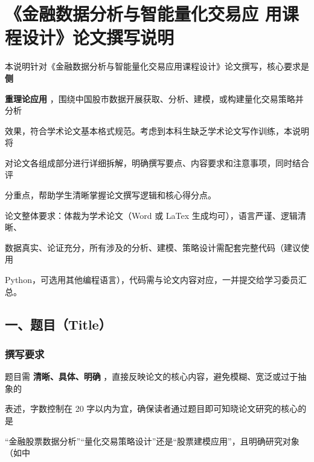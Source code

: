 \documentclass[
]{article}
\author{}
\date{}
\begin{document}
\hypertarget{ux91d1ux878dux6570ux636eux5206ux6790ux4e0eux667aux80fdux91cfux5316ux4ea4ux6613ux5e94-ux7528ux8bfeux7a0bux8bbeux8ba1ux8bbaux6587ux64b0ux5199ux8bf4ux660e}{%
\section{\texorpdfstring{\textbf{《金融数据分析与智能量化交易应}
\textbf{用课程设计》论文撰写说明}}{《金融数据分析与智能量化交易应 用课程设计》论文撰写说明}}\label{ux91d1ux878dux6570ux636eux5206ux6790ux4e0eux667aux80fdux91cfux5316ux4ea4ux6613ux5e94-ux7528ux8bfeux7a0bux8bbeux8ba1ux8bbaux6587ux64b0ux5199ux8bf4ux660e}}

本说明针对《金融数据分析与智能量化交易应用课程设计》论文撰写，核心要求是
\textbf{侧}

\textbf{重理论应用}
，围绕中国股市数据开展获取、分析、建模，或构建量化交易策略并分析

效果，符合学术论文基本格式规范。考虑到本科生缺乏学术论文写作训练，本说明将

对论文各组成部分进行详细拆解，明确撰写要点、内容要求和注意事项，同时结合评

分重点，帮助学生清晰掌握论文撰写逻辑和核心得分点。

论文整体要求：体裁为学术论文（Word 或 LaTex
生成均可），语言严谨、逻辑清晰、

数据真实、论证充分，所有涉及的分析、建模、策略设计需配套完整代码（建议使用

Python，可选用其他编程语言），代码需与论文内容对应，一并提交给学习委员汇总。

\hypertarget{ux4e00ux9898ux76eetitle}{%
\subsection{\texorpdfstring{\textbf{一、题目（Title）}}{一、题目（Title）}}\label{ux4e00ux9898ux76eetitle}}

\hypertarget{ux64b0ux5199ux8981ux6c42}{%
\subsubsection{\texorpdfstring{\textbf{撰写要求}}{撰写要求}}\label{ux64b0ux5199ux8981ux6c42}}

题目需 \textbf{清晰、具体、明确}
，直接反映论文的核心内容，避免模糊、宽泛或过于抽象的

表述，字数控制在 20
字以内为宜，确保读者通过题目即可知晓论文研究的核心的是

``金融股票数据分析''``量化交易策略设计''还是``股票建模应用''，且明确研究对象（如中
\end{document}
